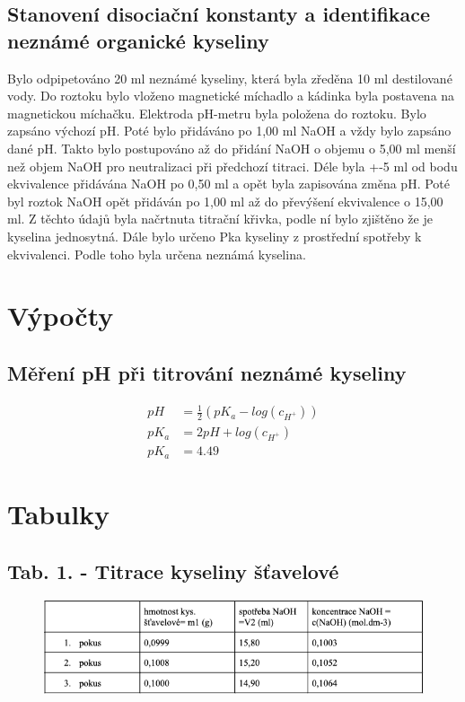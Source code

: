 \documentclass[13pt, a4paper, twoside]{article}
\begin{document}
    \subsection*{Stanovení disociační konstanty a identifikace neznámé organické kyseliny}
    Bylo odpipetováno 20 ml neznámé kyseliny, která byla zředěna 10 ml destilované vody. Do roztoku bylo vloženo magnetické míchadlo a kádinka byla postavena na magnetickou míchačku. Elektroda pH-metru byla položena do roztoku. Bylo zapsáno výchozí pH. Poté bylo přidáváno po 1,00 ml NaOH a vždy bylo zapsáno dané pH. Takto bylo postupováno až do přidání NaOH o objemu o 5,00 ml menší než objem NaOH pro neutralizaci při předchozí titraci. Déle byla +-5 ml od bodu ekvivalence přidávána NaOH po 0,50 ml a opět byla zapisována změna pH. Poté byl roztok NaOH opět přidáván po 1,00 ml až do převýšení ekvivalence o 15,00 ml. Z těchto údajů byla načrtnuta titrační křivka, podle ní bylo zjištěno že je kyselina jednosytná. Dále bylo určeno Pka kyseliny z prostřední spotřeby k ekvivalenci. Podle toho byla určena neznámá kyselina.
    
    \section*{Výpočty}
    \subsection*{Měření pH při titrování neznámé kyseliny}
    \begin{align*}
    pH &= \frac{1}{2}(pK_a - log(c_{H^+}))\\
    pK_a &= 2pH + log(c_{H^+})\\
    pK_a &= 4.49
    \end{align*}
    \section*{Tabulky}
    \subsection*{Tab. 1. - Titrace kyseliny šťavelové}
    \begin{figure}[H]
        \centering
        \includegraphics[width=7in]{kys_stav.png} 
    \end{figure}
\end{document}
